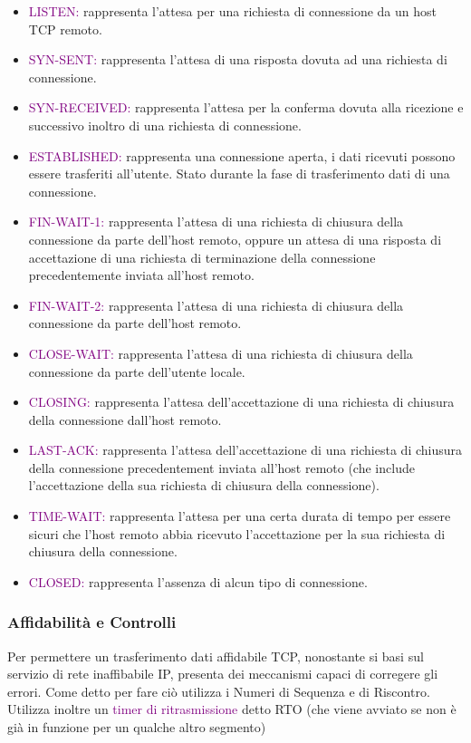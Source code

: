 \begin{itemize}
    \item \textcolor{purple}{LISTEN:} rappresenta l'attesa per una richiesta di connessione da un host TCP remoto.
    \item \textcolor{purple}{SYN-SENT:} rappresenta l'attesa di una risposta dovuta ad una richiesta di connessione.
    \item \textcolor{purple}{SYN-RECEIVED:} rappresenta l'attesa per la conferma dovuta alla ricezione e successivo inoltro di una richiesta di connessione.
    \item \textcolor{purple}{ESTABLISHED:} rappresenta una connessione aperta, i dati ricevuti possono essere trasferiti all'utente. Stato durante la fase di trasferimento dati di una connessione.
    \item \textcolor{purple}{FIN-WAIT-1:} rappresenta l'attesa di una richiesta di chiusura della connessione da parte dell'host remoto, oppure un attesa di una risposta di accettazione di una richiesta di terminazione della connessione precedentemente inviata all'host remoto.
    \item \textcolor{purple}{FIN-WAIT-2:} rappresenta l'attesa di una richiesta di chiusura della connessione da parte dell'host remoto.
    \item \textcolor{purple}{CLOSE-WAIT:} rappresenta l'attesa di una richiesta di chiusura della connessione da parte dell'utente locale.
    \item \textcolor{purple}{CLOSING:} rappresenta l'attesa dell'accettazione di una richiesta di chiusura della connessione dall'host remoto.
    \item \textcolor{purple}{LAST-ACK:} rappresenta l'attesa dell'accettazione di una richiesta di chiusura della connessione precedentement inviata all'host remoto (che include l'accettazione della sua richiesta di chiusura della connessione).
    \item \textcolor{purple}{TIME-WAIT:} rappresenta l'attesa per una certa durata di tempo per essere sicuri che l'host remoto abbia ricevuto l'accettazione per la sua richiesta di chiusura della connessione.
    \item \textcolor{purple}{CLOSED:} rappresenta l'assenza di alcun tipo di connessione.
\end{itemize}

\subsubsection{Affidabilità e Controlli}
Per permettere un trasferimento dati affidabile TCP, nonostante si basi sul servizio di rete inaffibabile IP, presenta dei meccanismi capaci di corregere gli errori. 
Come detto per fare ciò utilizza i Numeri di Sequenza e di Riscontro.
Utilizza inoltre un \textcolor{purple}{timer di ritrasmissione} detto RTO (che viene avviato se non è già in funzione per un qualche altro segmento)

